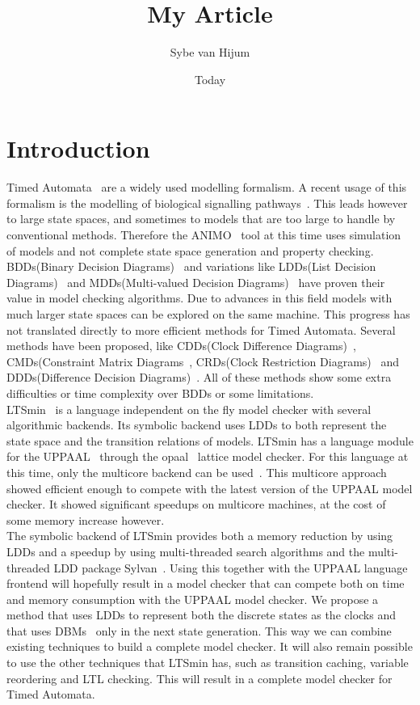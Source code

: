 \documentclass[11pt]{article}
\begin{document}
\newtheorem{mydef}{Definition}
\title{My Article}
\author{Sybe van Hijum}
\date{Today}
\maketitle

\section{Introduction}
Timed Automata~\cite{Alur1994183} are a widely used modelling formalism. A recent usage of this formalism is the modelling of biological signalling pathways~\cite{DBLP:conf/bibe/SchivoSWCVKLPP12}. This leads however to large state spaces, and sometimes to models that are too large to handle by conventional methods. Therefore the ANIMO~\cite{DBLP:conf/bibe/SchivoSWCVKLPP12} tool at this time uses simulation of models and not complete state space generation and property checking.
\\BDDs(Binary Decision Diagrams)~\cite{?} and variations like LDDs(List Decision Diagrams)~\cite{so62465} and MDDs(Multi-valued Decision Diagrams)~\cite{129849} have proven their value in model checking algorithms. Due to advances in this field models with much larger state spaces can be explored on the same machine. This progress has not translated directly to more efficient methods for Timed Automata. Several methods have been proposed, like CDDs(Clock Difference Diagrams)~\cite{BRICS19491}, CMDs(Constraint Matrix Diagrams~\cite{5702245}, CRDs(Clock Restriction Diagrams)~\cite{crds} and DDDs(Difference Decision Diagrams)~\cite{ddds}. All of these methods show some extra difficulties or time complexity over BDDs or some limitations.
\\LTSmin~\cite{eemcs18152,ltsmin-mc:nmf2011} is a language independent on the fly model checker with several algorithmic backends. Its symbolic backend uses LDDs to both represent the state space and the transition relations of models. LTSmin has a language module for the UPPAAL~\cite{UPPAAL} through the opaal~\cite{opaal} lattice model checker. For this language at this time, only the multicore backend can be used~\cite{eemcs21972}. This multicore approach showed efficient enough to compete with the latest version of the UPPAAL model checker. It showed significant speedups on multicore machines, at the cost of some memory increase however.
\\The symbolic backend of LTSmin provides both a memory reduction by using LDDs and a speedup by using multi-threaded search algorithms and the multi-threaded LDD package Sylvan~\cite{sylvan}. Using this together with the UPPAAL language frontend will hopefully result in a model checker that can compete both on time and memory consumption with the UPPAAL model checker. We propose a method that uses LDDs to represent both the discrete states as the clocks and that uses DBMs~\cite{dbmorig, bengtsson2002clocks} only in the next state generation. This way we can combine existing techniques to build a complete model checker. It will also remain possible to use the other techniques that LTSmin has, such as transition caching, variable reordering and LTL checking. This will result in a complete model checker for Timed Automata.
\end{document}
